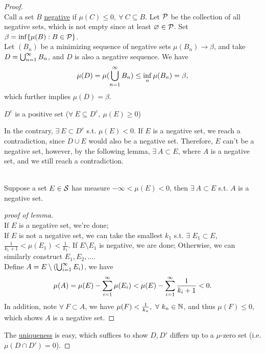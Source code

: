 \begin{proof}\ \\
Call a set $B$ \underline{negative} if $\mu(C) \leq 0,\ \forall\ C \subseteq B$. Let $\mathcal{P}$ be the collection of all negative sets, which is not empty since at least $\varnothing \in \mathcal{P}$. Set $\beta = \inf \{\mu(B): B \in \mathcal{P}\}$.\\
Let $(B_n)$ be a minimizing sequence of negative sets $\mu(B_n) \to \beta$, and take $D = \bigcup_{n=1}^{\infty} B_n$, and $D$ is also a negative sequence. We have
\begin{equation*}
    \mu(D) = \mu(\bigcup_{n=1}^{\infty} B_n) \leq \inf_n \mu(B_n) = \beta,
\end{equation*}
which further implies $\mu(D) = \beta$. 
\begin{claim}
$D^c$ is a positive set ($\forall\ E \subseteq D^c,\ \mu(E) \geq 0$)
\end{claim}
In the contrary, $\exists\ E \subset D^c$ s.t. $\mu(E) < 0$. If $E$ is a negative set, we reach a contradiction, since $D \cup E$ would also be a negative set. Therefore, $E$ can't be a negative set, however, by the following lemma, $\exists\ A \subset E$, where $A$ is a negative set, and we still reach a contradiction.
\begin{lemma}\ \\
Suppose a set $E \in \mathcal{S}$ has measure $-\infty<\mu(E)<0$, then $\exists\ A \subset E$ s.t. $A$ is a negative set.
\end{lemma}
\begin{proof}[proof of lemma]\ \\
If $E$ is a negative set, we're done;\\
If $E$ is not a negative set, we can take the smallest $k_1$ s.t. $\exists$ $E_1 \subset E$, $\frac{1}{k_1 + 1} <\mu(E_1) < \frac{1}{k_1}$. If $E \setminus E_1$ is negative, we are done; Otherwise, we can similarly construct $E_1,E_2,\dots$.\\
Define $A = E \setminus (\bigcup_{i=1}^{\infty} E_i)$, we have 
\begin{equation*}
    \mu(A) = \mu(E) - \sum\limits_{i=1}^\infty \mu(E_i) < \mu(E) - \sum\limits_{i=1}^\infty \frac{1}{k_i + 1} < 0.
\end{equation*}
In addition, note $\forall\ F \subset A$, we have $\mu(F) < \frac{1}{k_n},\ \forall\ k_n \in \N$, and thus $\mu(F) \leq 0$, which shows $A$ is a negative set.
\end{proof}
The \underline{uniqueness} is easy, which suffices to show $D,D'$ differs up to a $\mu$-zero set (i.e. $\mu(D \cap D') = 0$).
\end{proof}

